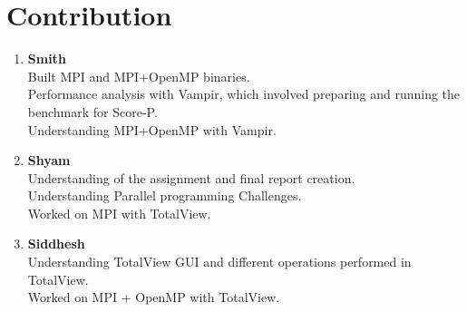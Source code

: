 \documentclass[10pt, letterpaper, twoside]{article}
\begin{document}
\begin{titlepage}
\begin{enumerate}
\end{enumerate}

\section{Contribution}

\begin{enumerate}
\item \textbf{Smith} \\ 
 Built MPI and MPI+OpenMP binaries. \\
 Performance analysis with Vampir, which involved preparing and running the benchmark for Score-P.\\
 Understanding MPI+OpenMP with Vampir. \\ 

\item \textbf{Shyam} \\ 
 Understanding of the assignment and final report creation.  \\
 Understanding Parallel programming Challenges. \\
 Worked on MPI with TotalView.\\

\item \textbf{Siddhesh} \\ 
 Understanding TotalView GUI and different operations performed in TotalView.  \\
 Worked on MPI + OpenMP with TotalView. \\

\end{enumerate}

\end{titlepage}
\end{document}
